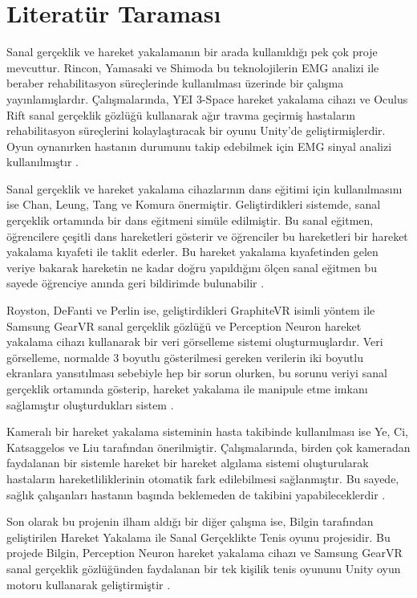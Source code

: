 \documentclass[a4paper, 12pt, titlepage]{article}
\begin{document}
\section{Literatür Taraması}
Sanal gerçeklik ve hareket yakalamanın bir arada kullanıldığı pek çok proje mevcuttur. Rincon,
Yamasaki ve Shimoda bu teknolojilerin EMG analizi ile beraber rehabilitasyon süreçlerinde
kullanılması üzerinde bir çalışma yayınlamışlardır. Çalışmalarında, YEI 3-Space hareket yakalama
cihazı ve Oculus Rift sanal gerçeklik gözlüğü kullanarak ağır travma geçirmiş hastaların
rehabilitasyon süreçlerini kolaylaştıracak bir oyunu Unity’de geliştirmişlerdir. Oyun oynanırken
hastanın durumunu takip edebilmek için EMG sinyal analizi kullanılmıştır \cite{edseee.743857520160101}.

Sanal gerçeklik ve hareket yakalama cihazlarının dans eğitimi için kullanılmasını ise Chan, Leung,
Tang ve Komura önermiştir. Geliştirdikleri sistemde, sanal gerçeklik ortamında bir dans eğitmeni
simüle edilmiştir. Bu sanal eğitmen, öğrencilere çeşitli dans hareketleri gösterir ve öğrenciler
bu hareketleri bir hareket yakalama kıyafeti ile taklit ederler. Bu hareket yakalama kıyafetinden
gelen veriye bakarak hareketin ne kadar doğru yapıldığını ölçen sanal eğitmen bu sayede öğrenciye
anında geri bildirimde bulunabilir \cite{edseee.555784020110101}.

Royston, DeFanti ve Perlin ise, geliştirdikleri GraphiteVR isimli yöntem ile Samsung GearVR sanal
gerçeklik gözlüğü ve Perception Neuron hareket yakalama cihazı kullanarak bir veri görselleme
sistemi oluşturmuşlardır. Veri görselleme, normalde 3 boyutlu gösterilmesi gereken verilerin iki
boyutlu ekranlara yansıtılması sebebiyle hep bir sorun olurken, bu sorunu veriyi sanal gerçeklik
ortamında gösterip, hareket yakalama ile manipule etme imkanı sağlamıştır oluşturdukları sistem \cite{royston2016collaborative}.

Kameralı bir hareket yakalama sisteminin hasta takibinde kullanılması ise Ye, Ci, Katsaggelos ve
Liu tarafından önerilmiştir. Çalışmalarında, birden çok kameradan faydalanan bir sistemle hareket
bir hareket algılama sistemi oluşturularak hastaların hareketliliklerinin otomatik fark
edilebilmesi sağlanmıştır. Bu sayede, sağlık çalışanları hastanın başında beklemeden de takibini
yapabileceklerdir \cite{edseee.660756620130101}.

Son olarak bu projenin ilham aldığı bir diğer çalışma ise, Bilgin tarafından geliştirilen Hareket
Yakalama ile Sanal Gerçeklikte Tenis oyunu projesidir. Bu projede Bilgin, Perception Neuron hareket
yakalama cihazı ve Samsung GearVR sanal gerçeklik gözlüğünden faydalanan bir tek kişilik tenis
oyununu Unity oyun motoru kullanarak geliştirmiştir \cite{ebilgin}.
\end{document}

